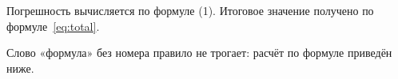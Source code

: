 Погрешность вычисляется по формуле (1).
Итоговое значение получено по формуле~\eqref{eq:total}.

Слово «формула» без номера правило не трогает: расчёт по формуле приведён ниже.
